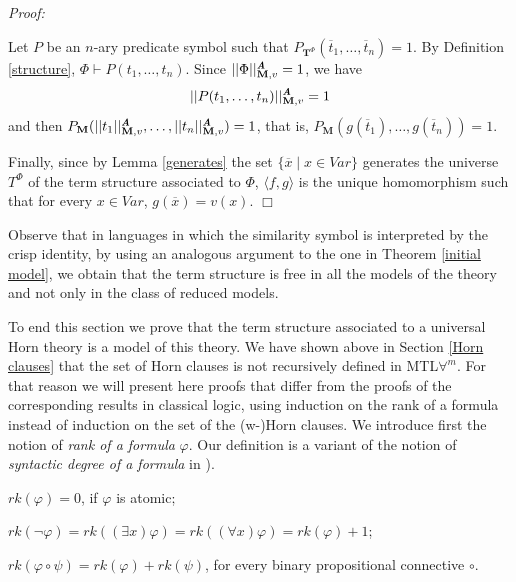 \documentclass{IOS-Book-Article}
\newenvironment{proof}{ \noindent \textit{Proof:} }
{\hfill$\Box$\endtrivlist}
\begin{document}
\begin{proof}
\bigskip

Let $P$ be an $n$-ary predicate symbol such that  $P_{\mathrm{\mathbf{T}}^{\Phi}}(\overline{t}_1,\ldots,\overline{t}_n)=1$. By Definition \ref{structure}, $\Phi\vdash P(t_1,\ldots,t_n)$. Since $|| \Phi||^{\emph{\textbf{A}}}_{\mathrm{\mathbf{M}},v}=1$, we have $$|| P(t_1,\ldots,t_n)||^{\emph{\textbf{A}}}_{\mathrm{\mathbf{M}},v}=1$$ and then $P_{\mathrm{\mathbf{M}}}(|| t_1||^{\emph{\textbf{A}}}_{\mathrm{\mathbf{M}},v},\ldots ,|| t_n ||^{\emph{\textbf{A}}}_{\mathrm{\mathbf{M}},v})=1$, that is, $P_{\mathrm{\mathbf{M}}}(g(\overline{t}_1),\ldots,g(\overline{t}_n))=1$.

\medskip

Finally, since by Lemma \ref{generates} the set $\{\overline{x}\mid x\in Var\}$ generates the universe $T^{\Phi}$ of the term structure associated to $\Phi$, $\langle f,g\rangle$ is the unique homomorphism such that for every $x \in Var$, $g(\overline{x})=v(x)$.   \end{proof}

\bigskip 

Observe that in languages in which the similarity symbol is interpreted by the crisp identity, by using an analogous argument to the one in Theorem \ref{initial model}, we obtain that the term structure is free in all the models of the theory and not only in the class of reduced models. 

\bigskip 


To end this section we prove that the term structure associated to a universal Horn theory is a model of this theory. We have shown above in Section \ref{Horn clauses} that the set of Horn clauses is not recursively defined in MTL$\forall^m$. For that reason we will present here proofs that differ from the proofs of the corresponding results in classical logic, using induction on the rank of a formula instead of induction on the set of the (w-)Horn clauses. We introduce first the notion of \emph{rank of a formula} $\varphi$. Our definition is a variant of the notion of \emph{syntactic degree of a formula} in 
\cite[Definition 5.6.7]{Ha98}).
\begin{description} 
\item $rk(\varphi)=0$, if $\varphi$ is atomic;
\item $rk(\neg\varphi)=rk((\exists x)\varphi)=rk((\forall x)\varphi)=rk(\varphi)+1$;
\item $rk(\varphi\circ\psi)=rk(\varphi)+rk(\psi)$, for every binary propositional connective $\circ$.
\end{description}
\end{document}
